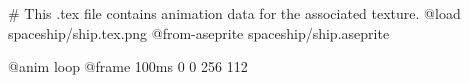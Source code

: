 # This .tex file contains animation data for the associated texture.
@load spaceship/ship.tex.png
@from-aseprite spaceship/ship.aseprite

@anim loop
	@frame 100ms 0 0 256 112
